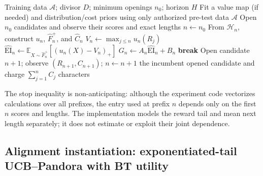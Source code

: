 \begin{algorithm}[t]
\caption{Unknown-distribution, unknown-cost Pandora blueprint}
\label{alg:blueprint}
\begin{algorithmic}[1]
\Require Training data $\mathcal A$; divisor $D$; minimum openings $n_0$;
         horizon $H$
\State Fit a value map (if needed) and distribution/cost priors using only
       authorized pre-test data $\mathcal A$
\State Open $n_0$ candidates and observe their scores and exact lengths
\State $n\gets n_0$
  \State From $\mathcal H_n$, construct $u_n$, $\widehat F_n^+$, and
         $\widehat C_n$
  \State $V_n\gets\max_{j\le n}u_n(R_j)$
  \State $\widehat{\mathrm{EI}}_n\gets
         \mathbb E_{X\sim\widehat F_n^+}[(u_n(X)-V_n)_+]$
  \State $G_n\gets A_n\widehat{\mathrm{EI}}_n+B_n$
    \State \textbf{break}
  \EndIf
  \State Open candidate $n+1$; observe $(R_{n+1},C_{n+1})$; $n\gets n+1$
\EndWhile
\State \Return the incumbent opened candidate and charge
       $\sum_{j=1}^{n}C_j$ characters
\end{algorithmic}
\end{algorithm}

The stop inequality is non-anticipating: although the experiment code
vectorizes calculations over all prefixes, the entry used at prefix $n$
depends only on the first $n$ scores and lengths.  The implementation models
the reward tail and mean next length separately; it does not estimate or
exploit their joint dependence.

\subsection{Alignment instantiation: exponentiated-tail UCB--Pandora with BT utility}
\label{sec:alignment-instantiation}

